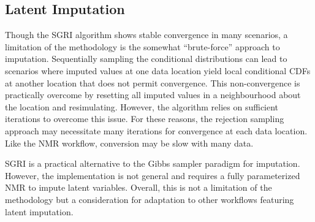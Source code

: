 
\subsection{Latent Imputation}
\label{subsec:07impute}

Though the \gls{SGRI} algorithm shows stable convergence in many scenarios, a limitation of the methodology is the somewhat ``brute-force'' approach to imputation. Sequentially sampling the conditional distributions can lead to scenarios where imputed values at one data location yield local conditional \glspl{CDF} at another location that does not permit convergence. This non-convergence is practically overcome by resetting all imputed values in a neighbourhood about the location and resimulating. However, the algorithm relies on sufficient iterations to overcome this issue. For these reasons, the rejection sampling approach may necessitate many iterations for convergence at each data location. Like the \gls{NMR} workflow, conversion may be slow with many data.

\Gls{SGRI} is a practical alternative to the Gibbs sampler paradigm for imputation. However, the implementation is not general and requires a fully parameterized \gls{NMR} to impute latent variables. Overall, this is not a limitation of the methodology but a consideration for adaptation to other workflows featuring latent imputation.


